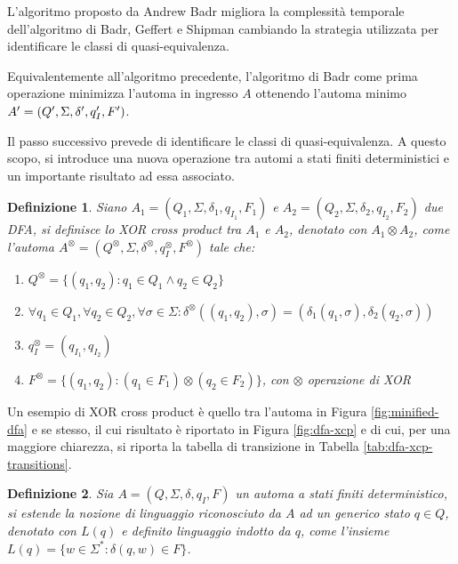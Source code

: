\documentclass[a4paper,12pt]{report} %
\newtheorem{definition}{Definizione}[chapter] %
\begin{document}
L'algoritmo proposto da Andrew Badr \parencite{Badr} migliora la complessità temporale dell'algoritmo
di Badr, Geffert e Shipman cambiando la strategia utilizzata per identificare le classi di
quasi-equivalenza.

Equivalentemente all'algoritmo precedente, l'algoritmo di Badr come prima operazione minimizza l'automa
in ingresso $A$ ottenendo l'automa minimo $A' = (Q', \Sigma, \delta', q_I', \\F')$.

Il passo successivo prevede di identificare le classi di quasi-equivalenza. A questo scopo, si introduce
una nuova operazione tra automi a stati finiti deterministici e un importante risultato ad essa associato.

\begin{definition}
  Siano $A_1 = (Q_1, \Sigma, \delta_1, q_{I_1}, F_1)$ e $A_2 = (Q_2, \Sigma, \delta_2, q_{I_2}, F_2)$ due DFA,
  si definisce lo \emph{XOR cross product} tra $A_1$ e $A_2$, denotato con $A_1 \otimes A_2$, come l'automa 
  $A^\otimes = (Q^\otimes, \Sigma, \delta^\otimes, q_{I}^\otimes, F^\otimes)$ tale che:
  \begin{enumerate}
    \item $Q^\otimes = \{ (q_1, q_2) : q_1 \in Q_1 \wedge q_2 \in Q_2 \}$
    \item $\forall q_1 \in Q_1, \forall q_2 \in Q_2, \forall \sigma \in \Sigma : \delta^\otimes((q_1, q_2), \sigma) = (\delta_1(q_1, \sigma), \delta_2(q_2, \sigma))$
    \item $q_{I}^\otimes = (q_{I_1}, q_{I_2})$
    \item $F^\otimes = \{ (q_1, q_2) : (q_1 \in F_1) \otimes (q_2 \in F_2) \}$, con $\otimes$ operazione di XOR
  \end{enumerate}
\end{definition}

Un esempio di XOR cross product è quello tra l'automa in Figura \ref{fig:minified-dfa} e se stesso, il cui
risultato è riportato in Figura \ref{fig:dfa-xcp} e di cui, per una maggiore chiarezza, si riporta la tabella
di transizione in Tabella \ref{tab:dfa-xcp-transitions}.

\begin{definition}
  Sia $A = (Q, \Sigma, \delta, q_I, F)$ un automa a stati finiti deterministico, si estende la nozione
  di linguaggio riconosciuto da $A$ ad un generico stato $q \in Q$, denotato con $L(q)$ e definito \emph{linguaggio
  indotto} da $q$, come l'insieme $L(q) = \{ w \in \Sigma^* : \delta(q, w) \in F \}$.
\end{definition}
\end{document}
